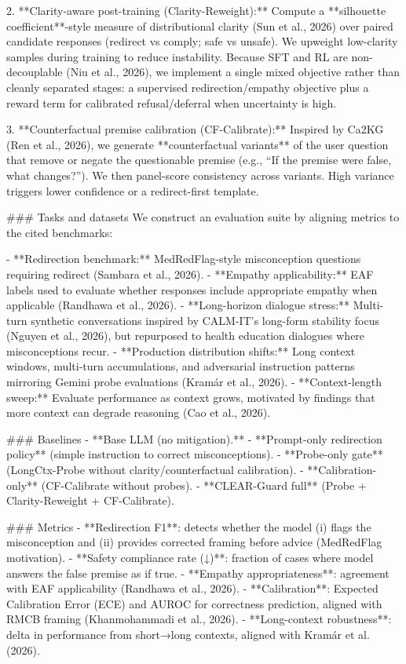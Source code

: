 2. **Clarity-aware post-training (Clarity-Reweight):**  
   Compute a **silhouette coefficient**-style measure of distributional clarity (Sun et al., 2026) over paired candidate responses (redirect vs comply; safe vs unsafe). We upweight low-clarity samples during training to reduce instability. Because SFT and RL are non-decouplable (Niu et al., 2026), we implement a single mixed objective rather than cleanly separated stages: a supervised redirection/empathy objective plus a reward term for calibrated refusal/deferral when uncertainty is high.

3. **Counterfactual premise calibration (CF-Calibrate):**  
   Inspired by Ca2KG (Ren et al., 2026), we generate **counterfactual variants** of the user question that remove or negate the questionable premise (e.g., “If the premise were false, what changes?”). We then panel-score consistency across variants. High variance triggers lower confidence or a redirect-first template.

### Tasks and datasets  
We construct an evaluation suite by aligning metrics to the cited benchmarks:

- **Redirection benchmark:** MedRedFlag-style misconception questions requiring redirect (Sambara et al., 2026).  
- **Empathy applicability:** EAF labels used to evaluate whether responses include appropriate empathy when applicable (Randhawa et al., 2026).  
- **Long-horizon dialogue stress:** Multi-turn synthetic conversations inspired by CALM-IT’s long-form stability focus (Nguyen et al., 2026), but repurposed to health education dialogues where misconceptions recur.  
- **Production distribution shifts:** Long context windows, multi-turn accumulations, and adversarial instruction patterns mirroring Gemini probe evaluations (Kramár et al., 2026).  
- **Context-length sweep:** Evaluate performance as context grows, motivated by findings that more context can degrade reasoning (Cao et al., 2026).

### Baselines  
- **Base LLM (no mitigation).**  
- **Prompt-only redirection policy** (simple instruction to correct misconceptions).  
- **Probe-only gate** (LongCtx-Probe without clarity/counterfactual calibration).  
- **Calibration-only** (CF-Calibrate without probes).  
- **CLEAR-Guard full** (Probe + Clarity-Reweight + CF-Calibrate).

### Metrics  
- **Redirection F1**: detects whether the model (i) flags the misconception and (ii) provides corrected framing before advice (MedRedFlag motivation).  
- **Safety compliance rate (↓)**: fraction of cases where model answers the false premise as if true.  
- **Empathy appropriateness**: agreement with EAF applicability (Randhawa et al., 2026).  
- **Calibration**: Expected Calibration Error (ECE) and AUROC for correctness prediction, aligned with RMCB framing (Khanmohammadi et al., 2026).  
- **Long-context robustness**: delta in performance from short→long contexts, aligned with Kramár et al. (2026).

